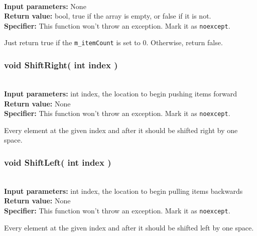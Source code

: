 \documentclass[a4paper,12pt]{book}
\begin{document}
    \begin{framed} ~\\
        \textbf{Input parameters:} None \\
        \textbf{Return value:} bool, true if the array is empty, or false if it is not. \\
        \textbf{Specifier:} This function won't throw an exception. Mark it as \texttt{noexcept}.
    \end{framed}

    Just return true if the \texttt{m\_itemCount} is set to 0. Otherwise,
    return false.



    \hrulefill
    \subsubsection*{void ShiftRight( int index )}

    \begin{framed} ~\\
        \textbf{Input parameters:} int index, the location to begin pushing items forward \\
        \textbf{Return value:} None \\
        \textbf{Specifier:} This function won't throw an exception. Mark it as \texttt{noexcept}.
    \end{framed}

    Every element at the given index and after it should be shifted right by one space.
    

    \newpage
    \subsubsection*{void ShiftLeft( int index )}

    \begin{framed} ~\\
        \textbf{Input parameters:} int index, the location to begin pulling items backwards \\
        \textbf{Return value:} None \\
        \textbf{Specifier:} This function won't throw an exception. Mark it as \texttt{noexcept}.
    \end{framed}

    Every element at the given index and after it should be shifted left by one space.
\end{document}
